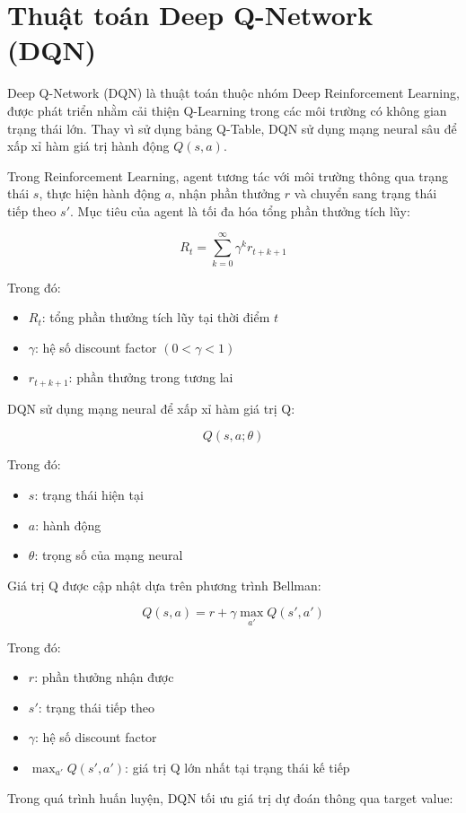 \section{Thuật toán Deep Q-Network (DQN)}

Deep Q-Network (DQN) là thuật toán thuộc nhóm Deep Reinforcement Learning, được phát triển nhằm cải thiện Q-Learning trong các môi trường có không gian trạng thái lớn. Thay vì sử dụng bảng Q-Table, DQN sử dụng mạng neural sâu để xấp xỉ hàm giá trị hành động $Q(s,a)$.

Trong Reinforcement Learning, agent tương tác với môi trường thông qua trạng thái $s$, thực hiện hành động $a$, nhận phần thưởng $r$ và chuyển sang trạng thái tiếp theo $s'$. Mục tiêu của agent là tối đa hóa tổng phần thưởng tích lũy:

\[
R_t = \sum_{k=0}^{\infty} \gamma^k r_{t+k+1}
\]

Trong đó:
\begin{itemize}
    \item $R_t$: tổng phần thưởng tích lũy tại thời điểm $t$
    \item $\gamma$: hệ số discount factor $(0 < \gamma < 1)$
    \item $r_{t+k+1}$: phần thưởng trong tương lai
\end{itemize}

DQN sử dụng mạng neural để xấp xỉ hàm giá trị Q:

\[
Q(s,a;\theta)
\]

Trong đó:
\begin{itemize}
    \item $s$: trạng thái hiện tại
    \item $a$: hành động
    \item $\theta$: trọng số của mạng neural
\end{itemize}

Giá trị Q được cập nhật dựa trên phương trình Bellman:

\[
Q(s,a)=r+\gamma \max_{a'}Q(s',a')
\]

Trong đó:
\begin{itemize}
    \item $r$: phần thưởng nhận được
    \item $s'$: trạng thái tiếp theo
    \item $\gamma$: hệ số discount factor
    \item $\max_{a'}Q(s',a')$: giá trị Q lớn nhất tại trạng thái kế tiếp
\end{itemize}

Trong quá trình huấn luyện, DQN tối ưu giá trị dự đoán thông qua target value:

